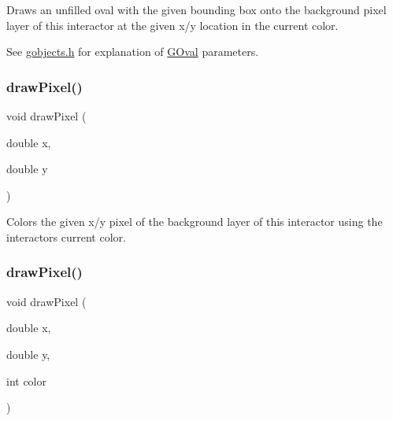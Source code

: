 Draws an unfilled oval with the given bounding box onto the background pixel layer of this interactor at the given x/y location in the current color. 

See \mbox{\hyperlink{gobjects_8h_source}{gobjects.\+h}} for explanation of \mbox{\hyperlink{classsgl_1_1GOval}{G\+Oval}} parameters. \mbox{\label{classsgl_1_1GDrawingSurface_a0c1e2923d8d163d62d0896d8c5cfa191}} 
\subsubsection{\texorpdfstring{draw\+Pixel()}{drawPixel()}\hspace{0.1cm}{\footnotesize\ttfamily [1/3]}}
{\footnotesize\ttfamily void draw\+Pixel (\begin{DoxyParamCaption}\item[{double}]{x,  }\item[{double}]{y }\end{DoxyParamCaption})\hspace{0.3cm}{\ttfamily [virtual]}}



Colors the given x/y pixel of the background layer of this interactor using the interactor\textquotesingle{}s current color. 

\mbox{\label{classsgl_1_1GDrawingSurface_a3a64eb6383e601be8438e9c71643c432}} 
\subsubsection{\texorpdfstring{draw\+Pixel()}{drawPixel()}\hspace{0.1cm}{\footnotesize\ttfamily [2/3]}}
{\footnotesize\ttfamily void draw\+Pixel (\begin{DoxyParamCaption}\item[{double}]{x,  }\item[{double}]{y,  }\item[{int}]{color }\end{DoxyParamCaption})\hspace{0.3cm}{\ttfamily [virtual]}}



